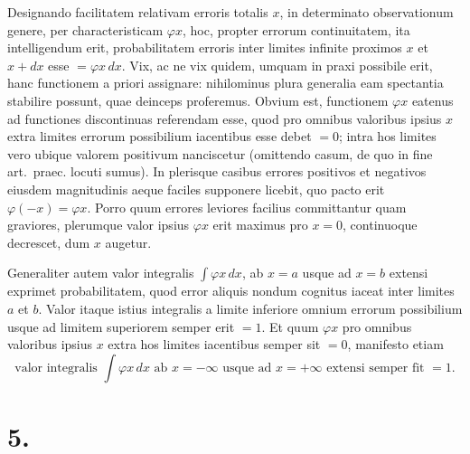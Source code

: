 \documentclass[12pt,a4paper]{book}
\begin{document}
Designando facilitatem relativam erroris totalis $x$, in determinato observationum genere, per characteristicam $\varphi x$, hoc, propter errorum continuitatem, ita intelligendum erit, probabilitatem erroris inter limites infinite proximos $x$ et $x+dx$ esse $=\varphi x\,dx$. Vix, ac ne vix quidem, umquam in praxi possibile erit, hanc functionem a priori assignare: nihilominus plura generalia eam spectantia stabilire possunt, quae deinceps proferemus. Obvium est, functionem $\varphi x$ eatenus ad functiones discontinuas referendam esse, quod pro omnibus valoribus ipsius $x$ extra limites errorum possibilium iacentibus esse debet $=0$; intra hos limites vero ubique valorem positivum nanciscetur (omittendo casum, de quo in fine art.~praec. locuti sumus). In plerisque casibus errores positivos et negativos eiusdem magnitudinis aeque faciles supponere licebit, quo pacto erit $\varphi(-x)=\varphi x$. Porro quum errores leviores facilius committantur quam graviores, plerumque valor ipsius $\varphi x$ erit maximus pro $x=0$, continuoque decrescet, dum $x$ augetur.

Generaliter autem valor integralis $\int\varphi x\,dx$, ab $x=a$ usque ad $x=b$ extensi exprimet probabilitatem, quod error aliquis nondum cognitus iaceat inter limites $a$ et $b$. Valor itaque istius integralis a limite inferiore omnium errorum possibilium usque ad limitem superiorem semper erit $=1$. Et quum $\varphi x$ pro omnibus valoribus ipsius $x$ extra hos limites iacentibus semper sit $=0$, manifesto etiam
%
\begin{equation*}
\text{valor integralis }\int\varphi x\,dx\text{ ab }x=-\infty\text{ usque ad }x=+\infty\text{ extensi semper fit }=1.
\end{equation*}

\section*{5.}
\label{sec:art5}
\end{document}
